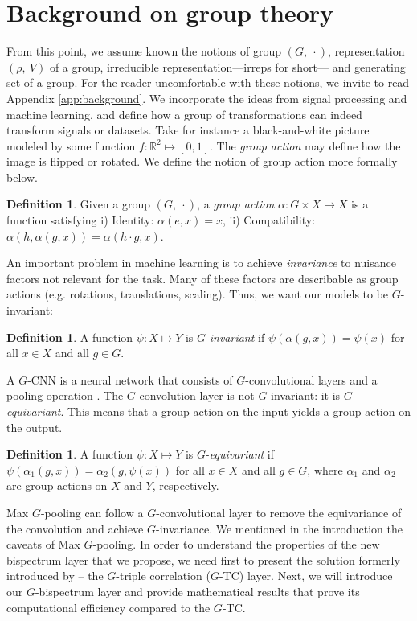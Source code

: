 \documentclass{article}
\theoremstyle{plain}
\theoremstyle{definition}
\newtheorem{definition}[theorem]{Definition}
\theoremstyle{remark}
\begin{document}
\section{Background on group theory}
From this point, we assume known the notions of group $(G,\ \cdot)$, representation $(\rho,\ V)$ of a group, irreducible representation---irreps for short--- and generating set of a group. For the reader uncomfortable with these notions, we invite to read Appendix \ref{app:background}. We incorporate the ideas from signal processing and machine learning, and define how a group of transformations can indeed transform signals or datasets.
Take for instance a black-and-white picture modeled by some function $f:\mathbb{R}^2\mapsto [0,1]$. The \emph{group action} may define how the image is flipped or rotated. We define the notion of group action more formally below.
\begin{definition}\label{def:groupaction}
    Given a group $(G,\ \cdot)$, a \emph{group action} $\alpha:G\times X\mapsto X$ is a function satisfying i) Identity: $\alpha(e, x)=x$, ii) Compatibility: $\alpha(h,\alpha(g,x))=\alpha(h\cdot g, x)$.
\end{definition}

An important problem in machine learning is to achieve \textit{invariance} to nuisance factors not relevant for the task. Many of these factors are describable as group actions (e.g. rotations, translations, scaling). Thus, we want our models to be $G$-invariant:
\begin{definition}
    A function $\psi:X\mapsto Y$ is $G$-\emph{invariant} if $\psi(\alpha(g,x)) = \psi(x)$ for all $x\in X$ and all $g\in G$.
\end{definition}
A $G$-CNN is a neural network that consists of $G$-convolutional layers and a pooling operation \cite{cohenc16}. The $G$-convolution layer is not $G$-invariant: it is $G$-\emph{equivariant}. This means that a group action on the input yields a group action on the output.
\begin{definition}
    A function $\psi:X\mapsto Y$ is $G$-\emph{equivariant} if $\psi(\alpha_1(g,x)) = \alpha_2(g,\psi(x))$ for all $x\in X$ and all $g\in G$, where $\alpha_1$ and $\alpha_2$ are group actions on $X$ and $Y$, respectively.
\end{definition}
Max $G$-pooling can follow a $G$-convolutional layer to remove the equivariance of the convolution and achieve $G$-invariance. We mentioned in the introduction the caveats of Max $G$-pooling. In order to understand the properties of the new bispectrum layer that we propose, we need first to present the solution formerly introduced by \cite{sanborn2023general} -- the $G$-triple correlation ($G$-TC) layer. Next, we will introduce our $G$-bispectrum layer and provide mathematical results that prove its computational efficiency compared to the $G$-TC.
\end{document}
